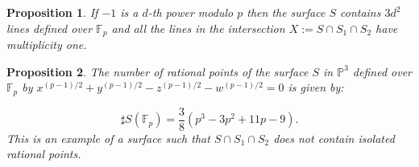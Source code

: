 \documentclass[10pt,a4paper]{amsart}
\newtheorem{proposition}{Proposition}
\begin{document}
\begin{proposition}\label{Number_Lines}
If $-1$ is a $d$-th power modulo $p$ then the  surface $S$ contains $3d^2$ lines defined over ${\mathbb F}_p$ and
all the lines in the intersection $X:=S\cap S_1 \cap S_2$ have multiplicity one.
\end{proposition}

\begin{proposition}
The number of rational points of the surface $S$ in ${\mathbb P}^3$ defined over ${\mathbb F}_p$  by 
$x^{(p-1)/2} + y^{(p-1)/2} -z^{(p-1)/2} -w^{(p-1)/2}=0$ is given by:

$$\sharp S({\mathbb F}_p)=\frac{3}{8}(p^3-3p^2+11p-9).$$
This is an example of a surface such that $S\cap S_1\cap S_2$ does not contain isolated rational points.
\end{proposition}
\end{document}
